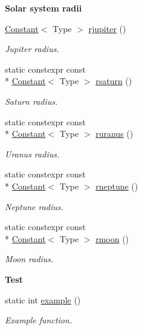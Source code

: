 \begin{Indent}{\bf Solar system radii}
\begin{DoxyCompactItemize}
\hyperlink{exceptionmagrathea_1_1Constant}{Constant}$<$ Type $>$ \hyperlink{exceptionmagrathea_1_1Constants_a528ce52b764b611c090322fd85c4615a}{rjupiter} ()
\begin{DoxyCompactList}\small\item\em Jupiter radius. \end{DoxyCompactList}\item 
static constexpr const \\*
\hyperlink{exceptionmagrathea_1_1Constant}{Constant}$<$ Type $>$ \hyperlink{exceptionmagrathea_1_1Constants_a03842706937d61b75e10c70c3b729100}{rsaturn} ()
\begin{DoxyCompactList}\small\item\em Saturn radius. \end{DoxyCompactList}\item 
static constexpr const \\*
\hyperlink{exceptionmagrathea_1_1Constant}{Constant}$<$ Type $>$ \hyperlink{exceptionmagrathea_1_1Constants_aa1ab5eb131300bc175bc33be49f20389}{ruranus} ()
\begin{DoxyCompactList}\small\item\em Uranus radius. \end{DoxyCompactList}\item 
static constexpr const \\*
\hyperlink{exceptionmagrathea_1_1Constant}{Constant}$<$ Type $>$ \hyperlink{exceptionmagrathea_1_1Constants_a7b2327bd72f44b853eda4d75f4700e1d}{rneptune} ()
\begin{DoxyCompactList}\small\item\em Neptune radius. \end{DoxyCompactList}\item 
static constexpr const \\*
\hyperlink{exceptionmagrathea_1_1Constant}{Constant}$<$ Type $>$ \hyperlink{exceptionmagrathea_1_1Constants_a8463cb95117d3e554139cc9c86f9f2d6}{rmoon} ()
\begin{DoxyCompactList}\small\item\em Moon radius. \end{DoxyCompactList}\end{DoxyCompactItemize}
\end{Indent}
\begin{Indent}{\bf Test}\par
\begin{DoxyCompactItemize}
\item 
static int \hyperlink{exceptionmagrathea_1_1Constants_aa55eec0f5bead2e1cc49760d580e2f6b}{example} ()
\begin{DoxyCompactList}\small\item\em Example function. \end{DoxyCompactList}\end{DoxyCompactItemize}
\end{Indent}


